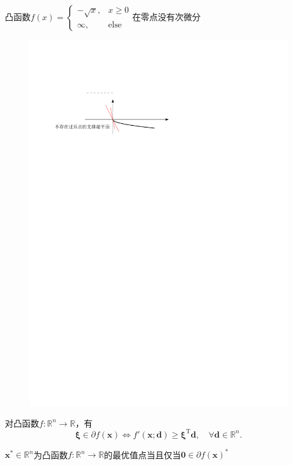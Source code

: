 \begin{example}
    凸函数$f(x)=\begin{cases}-\sqrt{x},&x\geqslant0\\[2ex]\infty,&\text{else}\end{cases}$在零点没有次微分
    \begin{figure}[htbp]
        \centering
        \includegraphics{image/支撑超平面example.pdf}
    \end{figure}
\end{example}
\begin{theorem}
    对凸函数$f:\mathbb{R}^n\to\mathbb{R}$，有
    \[
        \boldsymbol{\xi}\in\partial f(\boldsymbol{x})\Longleftrightarrow f'(\boldsymbol{x};\boldsymbol{d})\geqslant\boldsymbol{\xi}^\mathrm{T}\boldsymbol{d},\quad\forall \boldsymbol{d}\in\mathbb{R}^n.
    \]
\end{theorem}
\begin{theorem}
    $\boldsymbol{x}^*\in\mathbb{R}^n$为凸函数$f:\mathbb{R}^n\to\mathbb{R}$的最优值点当且仅当$\mathbf{0}\in\partial f(\boldsymbol{x})^*$
\end{theorem}
